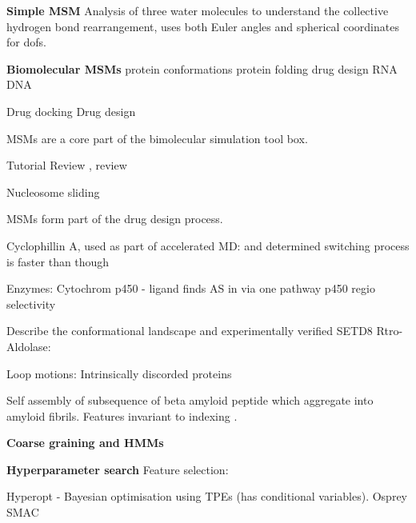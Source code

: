\textbf{Simple MSM}
Analysis of three water molecules \cite{schulzCollectiveHydrogenbondRearrangement2018} to understand the collective hydrogen bond rearrangement, uses both Euler angles and spherical coordinates for dofs. 

\textbf{Biomolecular MSMs}
protein conformations
protein folding
drug design
RNA
DNA

Drug docking \cite{amaroEnsembleDockingDrug2018}
Drug design \cite{gervasioBiomolecularSimulationsStructureBased2019}

MSMs are a core part of the bimolecular simulation tool box\cite{hugginsBiomolecularSimulationsDynamics2019}. 

Tutorial \cite{wangConstructingMarkovState2018c}
Review \cite{noeMarkovModelsMolecular2019b}, review \cite{husicMarkovStateModels2018}

Nucleosome sliding \cite{brandaniDNASlidingNucleosomes2018}


MSMs form part of the drug design process. \cite{gervasioBiomolecularSimulationsStructureBased2019}

Cyclophillin A, used as part of accelerated MD: \cite{juarez-jimenezDynamicDesignManipulation2020b} and determined switching process is faster than though \cite{wapeesittipanAllostericEffectsCyclophilin2019}

Enzymes:
Cytochrom p450 - ligand finds AS in via one pathway \cite{ahalawatMappingSubstrateRecognition2018a}
p450 regio selectivity \cite{dodaniDiscoveryRegioselectivitySwitch2016a}

Describe the conformational landscape and experimentally verified SETD8 \cite{chenDynamicConformationalLandscape2019a}
Rtro-Aldolase: \cite{romero-riveraRoleConformationalDynamics2017}

Loop motions: \cite{LoopMotionTriosephosphate}
Intrinsically discorded proteins \cite{schorAnalyticalMethodsStructural2016a}

Self assembly of subsequence of beta amyloid peptide which aggregate into amyloid fibrils. Features invariant to indexing \cite{senguptaAutomatedMarkovState2019}. 






\textbf{Coarse graining and HMMs}


\textbf{Hyperparameter search}
Feature selection: \cite{schererVariationalSelectionFeatures2019}


\cite{bergstraHyperoptPythonLibrary2013} Hyperopt - Bayesian optimisation using TPEs (has conditional variables). 
\cite{mcgibbonOspreyHyperparameterOptimization2016a} Osprey
\cite{hutterSequentialModelbasedOptimization2011} SMAC

